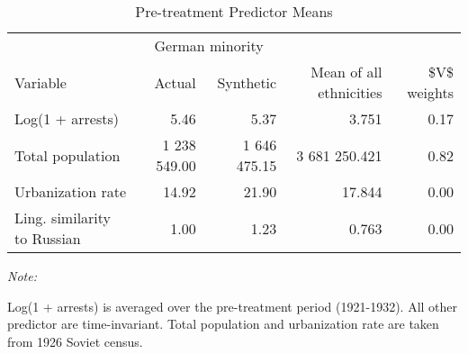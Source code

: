 \begin{table}[!h]

\caption{\label{tab:sc_predictor_means_robustness}Pre-treatment Predictor Means}
\centering
\begin{threeparttable}
\fontsize{10}{12}\selectfont
\begin{tabular}{lrrrr}
\toprule
\multicolumn{1}{c}{ } & \multicolumn{2}{c}{German minority} \\
\cmidrule(l{2pt}r{2pt}){2-3}
Variable & Actual & Synthetic & Mean of all ethnicities & \$V\$ weights\\
\midrule
Log(1 + arrests) & 5.46 & 5.37 & 3.751 & 0.17\\
Total population & 1 238 549.00 & 1 646 475.15 & 3 681 250.421 & 0.82\\
Urbanization rate & 14.92 & 21.90 & 17.844 & 0.00\\
Ling. similarity to Russian & 1.00 & 1.23 & 0.763 & 0.00\\
\bottomrule
\end{tabular}
\begin{tablenotes}
\item \textit{Note: } 
\item Log(1 + arrests) is averaged over the pre-treatment period (1921-1932). All other predictor are time-invariant. Total population and urbanization rate are taken from 1926 Soviet census.
\end{tablenotes}
\end{threeparttable}
\end{table}